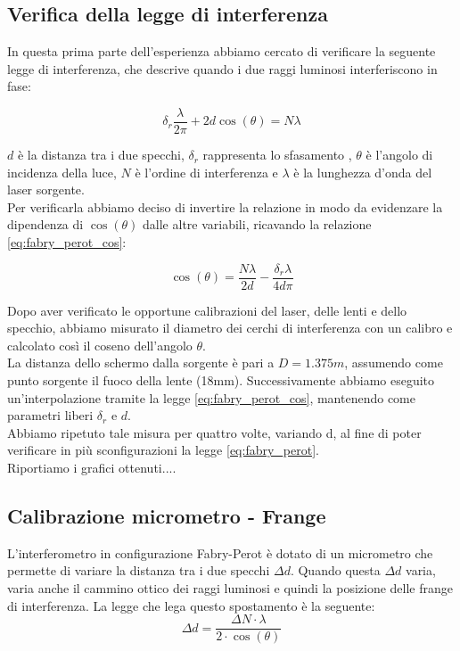 \documentclass[letterpaper,12pt]{article}
\begin{document}
\subsection{Verifica della legge di interferenza}

In questa prima parte dell'esperienza abbiamo cercato di verificare
la seguente legge di interferenza, che descrive quando i due raggi luminosi interferiscono in fase:

\begin{equation}
    \delta_r \frac{\lambda}{2 \pi} + 2d \cos(\theta) = N \lambda
    \label{eq:fabry_perot}
\end{equation}

$d$ è la distanza tra i due specchi, $\delta_r$ rappresenta lo sfasamento , $\theta$ è l'angolo di incidenza della luce, $N$ è l'ordine di interferenza e $\lambda$ 
è la lunghezza d'onda del laser sorgente. \\
Per verificarla abbiamo deciso di invertire la relazione in modo da evidenzare la dipendenza di $\cos(\theta)$ dalle
altre variabili, ricavando la relazione \ref{eq:fabry_perot_cos}:

\begin{equation}
    \cos(\theta) = \frac{N \lambda}{2d} - \frac{\delta_r \lambda}{4 d \pi}
    \label{eq:fabry_perot_cos}
\end{equation}

Dopo aver verificato le opportune calibrazioni del laser, delle lenti e dello specchio,
abbiamo misurato il diametro dei cerchi di interferenza con un calibro e calcolato così il coseno dell'angolo $\theta$. \\
La distanza dello schermo dalla sorgente è pari a $D = 1.375 m$, assumendo come punto sorgente il fuoco della lente (18mm). Successivamente abbiamo eseguito 
un'interpolazione tramite la legge \ref{eq:fabry_perot_cos}, mantenendo come parametri liberi $\delta_r$ e $d$.\\
Abbiamo ripetuto tale misura per quattro volte, variando d, al fine di poter verificare in più sconfigurazioni la legge \ref{eq:fabry_perot}.\\
Riportiamo i grafici ottenuti....


\subsection{Calibrazione micrometro - Frange}
L'interferometro in configurazione Fabry-Perot è dotato di un micrometro che permette 
di variare la distanza tra i due specchi $\Delta d$.
Quando questa $\Delta d$ varia, varia anche il cammino ottico dei raggi luminosi e quindi la posizione delle frange di interferenza.
La legge che lega questo spostamento è la seguente:
    \begin{equation}
        \Delta d = \frac{\Delta N \cdot \lambda}{2 \cdot \cos(\theta)}
        \label{eq:micrometro}
    \end{equation}
\end{document}
